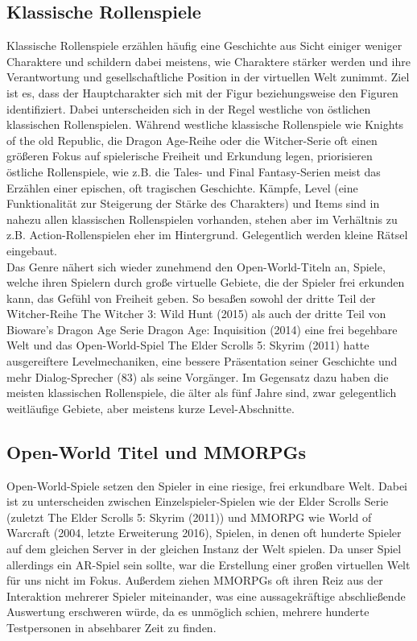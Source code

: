 \documentclass[extern,palatino]{cgBA}
\begin{document}
	\subsection{Klassische Rollenspiele}
	Klassische Rollenspiele erzählen häufig eine Geschichte aus Sicht einiger weniger Charaktere und schildern dabei meistens, wie Charaktere stärker werden und ihre Verantwortung und gesellschaftliche Position in der virtuellen Welt zunimmt. Ziel ist es, dass der Hauptcharakter sich mit der Figur beziehungsweise den Figuren identifiziert. Dabei unterscheiden sich in der Regel westliche von östlichen klassischen Rollenspielen. Während westliche klassische Rollenspiele wie Knights of the old Republic, die Dragon Age-Reihe oder die Witcher-Serie oft einen größeren Fokus auf spielerische Freiheit und Erkundung legen, priorisieren östliche Rollenspiele, wie z.B. die Tales- und Final Fantasy-Serien meist das Erzählen einer epischen, oft tragischen Geschichte.
	Kämpfe, Level (eine Funktionalität zur Steigerung der Stärke des Charakters) und Items sind in nahezu allen klassischen Rollenspielen vorhanden, stehen aber im Verhältnis zu z.B. Action-Rollenspielen eher im Hintergrund. Gelegentlich werden kleine Rätsel eingebaut.
	\\Das Genre nähert sich wieder zunehmend den Open-World-Titeln an, Spiele, welche ihren Spielern durch große virtuelle Gebiete, die der Spieler frei erkunden kann, das Gefühl von Freiheit geben. So besaßen sowohl der dritte Teil der Witcher-Reihe The Witcher 3: Wild Hunt (2015) als auch der dritte Teil von Bioware's Dragon Age Serie Dragon Age: Inquisition (2014) eine frei begehbare Welt und das Open-World-Spiel The Elder Scrolls 5: Skyrim (2011) hatte ausgereiftere Levelmechaniken, eine bessere Präsentation seiner Geschichte und mehr Dialog-Sprecher (83)\cite{crtes} als seine Vorgänger. Im Gegensatz dazu haben die meisten klassischen Rollenspiele, die älter als fünf Jahre sind, zwar gelegentlich weitläufige Gebiete, aber meistens kurze Level-Abschnitte. %
	
	\subsection{Open-World Titel und MMORPGs}
	Open-World-Spiele setzen den Spieler in eine riesige, frei erkundbare Welt. Dabei ist zu unterscheiden zwischen Einzelspieler-Spielen wie der Elder Scrolls Serie (zuletzt The Elder Scrolls 5: Skyrim (2011)) und MMORPG wie World of Warcraft (2004, letzte Erweiterung 2016), Spielen, in denen oft hunderte Spieler auf dem gleichen Server in der gleichen Instanz der Welt spielen. Da unser Spiel allerdings ein AR-Spiel sein sollte, war die Erstellung einer großen virtuellen Welt für uns nicht im Fokus. Außerdem ziehen MMORPGs oft ihren Reiz aus der Interaktion mehrerer Spieler miteinander, was eine aussagekräftige abschließende Auswertung erschweren würde, da es unmöglich schien, mehrere hunderte Testpersonen in absehbarer Zeit zu finden.
\end{document}
